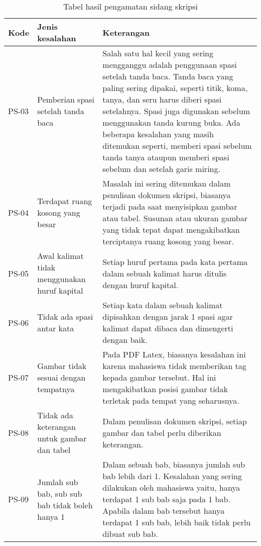 \begin{table}[H]
	\renewcommand{\arraystretch}{1.5}
	\caption {Tabel hasil pengamatan sidang skripsi} \label{tab:hasil_sidang2}
	\begin{center}
		\begin{tabular}{|p{1.5 cm}|>{\raggedright} p{5.5 cm}| p{7.5 cm}|}
		\hline
		Kode & Jenis kesalahan & Keterangan \\ 
		\hline		
		PS-03 & Pemberian spasi setelah tanda baca & Salah satu hal kecil yang sering mengganggu adalah penggunaan spasi setelah tanda baca. Tanda baca yang paling sering dipakai, seperti titik, koma, tanya, dan seru harus diberi spasi setelahnya. Spasi juga digunakan sebelum menggunakan tanda kurung buka. Ada beberapa kesalahan yang masih ditemukan seperti, memberi spasi sebelum tanda tanya ataupun memberi spasi sebelum dan setelah garis miring. \newline \\ 
		\hline
		PS-04 & Terdapat ruang kosong yang besar & Masalah ini sering ditemukan dalam penulisan dokumen skripsi, biasanya terjadi pada saat menyisipkan gambar atau tabel. Susunan atau ukuran gambar yang tidak tepat dapat mengakibatkan terciptanya ruang kosong yang besar. \newline \\
		\hline 
		PS-05 & Awal kalimat tidak menggunakan huruf kapital & Setiap huruf pertama pada kata pertama dalam sebuah kalimat harus ditulis dengan huruf kapital. \newline \\  
		\hline 
		PS-06 & Tidak ada spasi antar kata & Setiap kata dalam sebuah kalimat dipisahkan dengan jarak 1 spasi agar kalimat dapat dibaca dan dimengerti dengan baik. \newline \\ 
		\hline 
		PS-07 & Gambar tidak sesuai dengan tempatnya & Pada PDF Latex, biasanya kesalahan ini karena mahasiswa tidak memberikan tag kepada gambar tersebut. Hal ini mengakibatkan posisi gambar tidak terletak pada tempat yang seharusnya. \newline \\ 
		\hline 
		PS-08 & Tidak ada keterangan untuk gambar dan tabel & Dalam penulisan dokumen skripsi, setiap gambar dan tabel perlu diberikan keterangan.
 \newline \\ 
		\hline 
		PS-09 & Jumlah sub bab, sub sub bab tidak boleh hanya 1 & Dalam sebuah bab, biasanya jumlah sub bab lebih dari 1. Kesalahan yang sering dilakukan oleh mahasiswa yaitu, hanya terdapat 1 sub bab saja pada 1 bab. Apabila dalam bab tersebut hanya terdapat 1 sub bab, lebih baik tidak perlu dibuat sub bab. \newline \\ 
		\hline 
		\end{tabular}
	\end{center}
\end{table}

